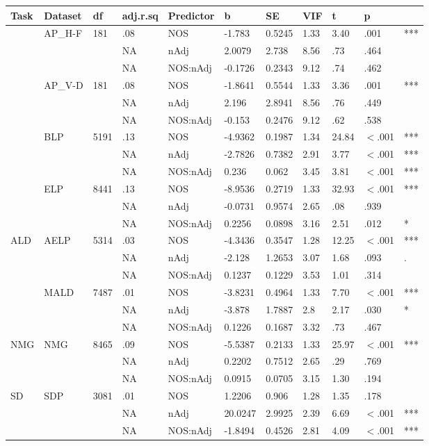 \begin{table}[ht]
\centering
\begingroup\normalsize
\begin{tabular}{lllllllllll}
  \hline
Task & Dataset & df & adj.r.sq & Predictor & b & SE & VIF & t & p &  \\ 
  \hline
 & AP\_H-F & 181 & .08 & NOS & -1.783 & 0.5245 & 1.33 & 3.40 & .001 & *** \\ 
   &  &  & NA & nAdj & 2.0079 & 2.738 & 8.56 & .73 & .464 &   \\ 
   &  &  & NA & NOS:nAdj & -0.1726 & 0.2343 & 9.12 & .74 & .462 &   \\ 
   & AP\_V-D & 181 & .08 & NOS & -1.8641 & 0.5544 & 1.33 & 3.36 & .001 & *** \\ 
   &  &  & NA & nAdj & 2.196 & 2.8941 & 8.56 & .76 & .449 &   \\ 
   &  &  & NA & NOS:nAdj & -0.153 & 0.2476 & 9.12 & .62 & .538 &   \\ 
   & BLP & 5191 & .13 & NOS & -4.9362 & 0.1987 & 1.34 & 24.84 & $<$.001 & *** \\ 
   &  &  & NA & nAdj & -2.7826 & 0.7382 & 2.91 & 3.77 & $<$.001 & *** \\ 
   &  &  & NA & NOS:nAdj & 0.236 & 0.062 & 3.45 & 3.81 & $<$.001 & *** \\ 
   & ELP & 8441 & .13 & NOS & -8.9536 & 0.2719 & 1.33 & 32.93 & $<$.001 & *** \\ 
   &  &  & NA & nAdj & -0.0731 & 0.9574 & 2.65 & .08 & .939 &   \\ 
   &  &  & NA & NOS:nAdj & 0.2256 & 0.0898 & 3.16 & 2.51 & .012 & * \\ 
  ALD & AELP & 5314 & .03 & NOS & -4.3436 & 0.3547 & 1.28 & 12.25 & $<$.001 & *** \\ 
   &  &  & NA & nAdj & -2.128 & 1.2653 & 3.07 & 1.68 & .093 & . \\ 
   &  &  & NA & NOS:nAdj & 0.1237 & 0.1229 & 3.53 & 1.01 & .314 &   \\ 
   & MALD & 7487 & .01 & NOS & -3.8231 & 0.4964 & 1.33 & 7.70 & $<$.001 & *** \\ 
   &  &  & NA & nAdj & -3.878 & 1.7887 & 2.8 & 2.17 & .030 & * \\ 
   &  &  & NA & NOS:nAdj & 0.1226 & 0.1687 & 3.32 & .73 & .467 &   \\ 
  NMG & NMG & 8465 & .09 & NOS & -5.5387 & 0.2133 & 1.33 & 25.97 & $<$.001 & *** \\ 
   &  &  & NA & nAdj & 0.2202 & 0.7512 & 2.65 & .29 & .769 &   \\ 
   &  &  & NA & NOS:nAdj & 0.0915 & 0.0705 & 3.15 & 1.30 & .194 &   \\ 
  SD & SDP & 3081 & .01 & NOS & 1.2206 & 0.906 & 1.28 & 1.35 & .178 &   \\ 
   &  &  & NA & nAdj & 20.0247 & 2.9925 & 2.39 & 6.69 & $<$.001 & *** \\ 
   &  &  & NA & NOS:nAdj & -1.8494 & 0.4526 & 2.81 & 4.09 & $<$.001 & *** \\ 
   \hline
\end{tabular}
\endgroup
\end{table}
